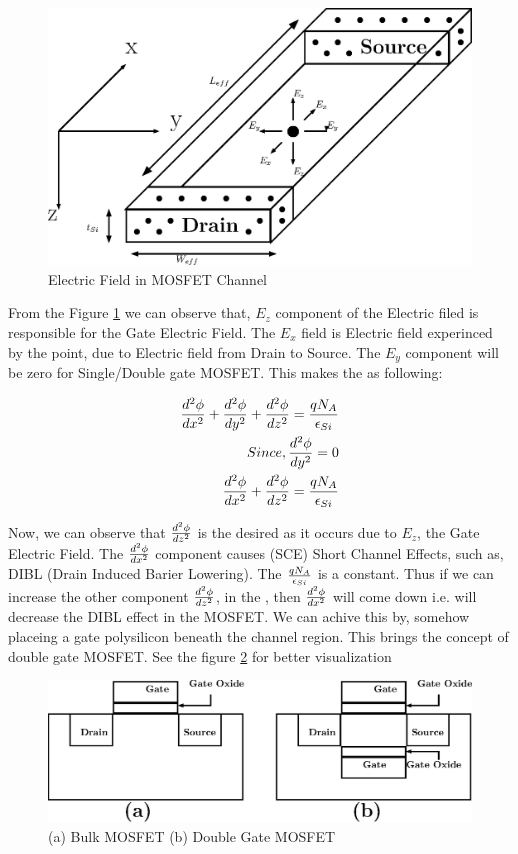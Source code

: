 \documentclass[a4paper]{article}
\begin{document}
\begin{figure}[h!]
  \includegraphics[scale=0.8]{./BulkFinFET-EField-in-Channel.eps}
  \caption{Electric Field in MOSFET Channel}
  \label{fig:E-Field-in-channel}
\end{figure}

From the Figure \ref{fig:E-Field-in-channel} we can observe that, $E_z$ component of the Electric filed is responsible for the Gate Electric Field. The $E_x$ field is Electric field experinced by the point, due to Electric field from Drain to Source. The $E_y$ component will be zero for Single/Double gate MOSFET. This makes the \PE as following:

\begin{align*}
  \frac {d^2\phi} {dx^2} + \frac {d^2\phi} {dy^2} + \frac {d^2\phi} {dz^2} = \frac{qN_A} {\epsilon_{Si}}\\
  Since, \frac {d^2\phi} {dy^2} = 0\\
  \frac {d^2\phi} {dx^2} + \frac {d^2\phi} {dz^2} = \frac{qN_A} {\epsilon_{Si}}
\end{align*}

Now, we can observe that $\frac {d^2\phi} {dz^2}$ is the desired as it occurs due to $E_z$, the Gate Electric Field. The $\frac {d^2\phi} {dx^2}$ component causes (SCE) Short Channel Effects, such as, DIBL (Drain Induced Barier Lowering). The $\frac{qN_A} {\epsilon_{Si}}$ is a constant. Thus if we can increase the other component $\frac {d^2\phi} {dz^2}$, in the \PE, then $\frac {d^2\phi} {dx^2}$ will come down i.e. will decrease the DIBL effect in the MOSFET. We can achive this by, somehow placeing a gate polysilicon beneath the channel region. This brings the concept of double gate MOSFET. See the figure \ref {fig:MOS-DGMOS} for better visualization\\

\begin{figure}[h!]
  \includegraphics[scale=0.8]{./BulkFinFET-bulk-MOSFET.eps}
  \caption{(a) Bulk MOSFET (b) Double Gate MOSFET}
  \label{fig:MOS-DGMOS}
\end{figure}
\end{document}
